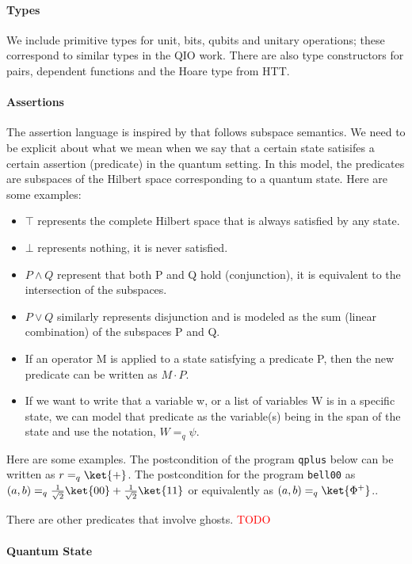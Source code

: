 \documentclass[acmsmall,nonacm,timestamp,review=false,anonymous=false]{acmart}
\newcommand{\todo}[1]{\textcolor{red}{#1}}
\begin{document}
\paragraph{Types} We include primitive types for unit, bits, qubits and unitary operations; these correspond to similar types in the QIO work. There are also type constructors for pairs, dependent functions and the Hoare type from HTT.

\paragraph{Assertions}
The assertion language is inspired by \citet{unruh2019} that follows subspace semantics. We need to be explicit about what we mean when we say that a certain state satisifes a certain assertion (predicate) in the quantum setting. In this model, the predicates are subspaces of the Hilbert space corresponding to a quantum state. Here are some examples:
\begin{itemize}
	\item $\top$ represents the complete Hilbert space that is always satisfied by any state.
	\item $\bot$ represents nothing, it is never satisfied.
	\item $P \wedge Q$ represent that both P and Q hold (conjunction), it is equivalent to the intersection of the subspaces.
	\item $P \vee Q$ similarly represents disjunction and is modeled as the sum (linear combination) of the subspaces P and Q.
	\item If an operator M is applied to a state satisfying a predicate P, then the new predicate can be written as $M \cdot P$.
	\item If we want to write that a variable w, or a list of variables W is in a specific state, we can model that predicate as the variable(s) being in the span of the state and use the notation, $W =_q \psi$.
\end{itemize}

Here are some examples. The postcondition of the program \texttt{qplus} below can be written as $r =_q \ket{+}$. The postcondition for the program \texttt{bell00} as $(a, b) =_q \frac{1}{\sqrt{2}}\ket{00}+\frac{1}{\sqrt{2}}\ket{11}$ or equivalently as $(a, b) =_q \ket{\Phi^+}$..

There are other predicates that involve ghosts. \todo{TODO}

\paragraph{Quantum State}
\end{document}
